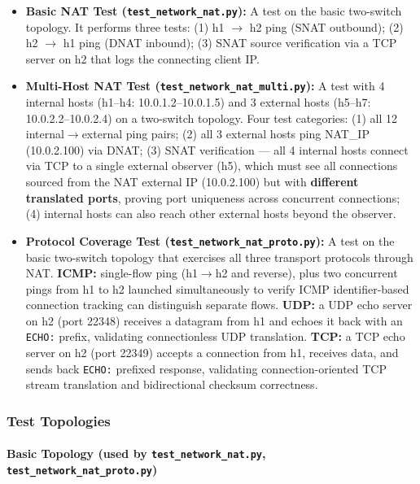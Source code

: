 \documentclass[12pt,a4paper]{article}
\begin{document}
\begin{itemize}[leftmargin=1.5cm]
    \item \textbf{Basic NAT Test (\texttt{test\_network\_nat.py}):} A test on the basic two-switch topology. It performs three tests: (1) h1 $\rightarrow$ h2 ping (SNAT outbound); (2) h2 $\rightarrow$ h1 ping (DNAT inbound); (3) SNAT source verification via a TCP server on h2 that logs the connecting client IP.
    \item \textbf{Multi-Host NAT Test (\texttt{test\_network\_nat\_multi.py}):} A test with 4 internal hosts (h1--h4: 10.0.1.2--10.0.1.5) and 3 external hosts (h5--h7: 10.0.2.2--10.0.2.4) on a two-switch topology. Four test categories: (1) all 12 internal$\rightarrow$external ping pairs; (2) all 3 external hosts ping NAT_IP (10.0.2.100) via DNAT; (3) SNAT verification --- all 4 internal hosts connect via TCP to a single external observer (h5), which must see all connections sourced from the NAT external IP (10.0.2.100) but with \textbf{different translated ports}, proving port uniqueness across concurrent connections; (4) internal hosts can also reach other external hosts beyond the observer.
    \item \textbf{Protocol Coverage Test (\texttt{test\_network\_nat\_proto.py}):} A test on the basic two-switch topology that exercises all three transport protocols through NAT. \textbf{ICMP:} single-flow ping (h1$\rightarrow$h2 and reverse), plus two concurrent pings from h1 to h2 launched simultaneously to verify ICMP identifier-based connection tracking can distinguish separate flows. \textbf{UDP:} a UDP echo server on h2 (port 22348) receives a datagram from h1 and echoes it back with an \texttt{ECHO:} prefix, validating connectionless UDP translation. \textbf{TCP:} a TCP echo server on h2 (port 22349) accepts a connection from h1, receives data, and sends back \texttt{ECHO:} prefixed response, validating connection-oriented TCP stream translation and bidirectional checksum correctness.
\end{itemize}

\subsubsection{Test Topologies}

\paragraph{Basic Topology (used by \texttt{test\_network\_nat.py}, \texttt{test\_network\_nat\_proto.py})}
\end{document}
